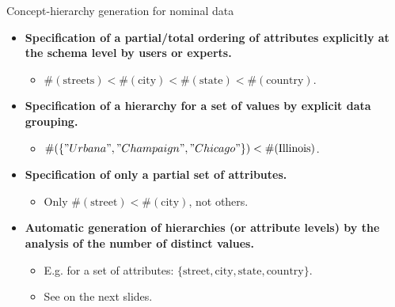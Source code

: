 \documentclass[aspectratio=169,t]{beamer}
\begin{document}
  { 
    \begin{frame}{Concept-hierarchy generation for nominal data}
        \begin{itemize}
            \item \textbf{Specification of a partial/total ordering of attributes explicitly at the schema level by users or experts.}
            \begin{itemize}
              \item $\#(\text{streets}) < \#(\text{city}) < \#(\text{state}) < \#(\text{country})$.
            \end{itemize}
            \item \textbf{Specification of a hierarchy for a set of values by explicit data grouping.}
            \begin{itemize}
              \item $\#(\{"Urbana", "Champaign", "Chicago"\}) < \#(\text{Illinois})$.
            \end{itemize}
            \item \textbf{Specification of only a partial set of attributes.}
            \begin{itemize}
              \item Only $\#(\text{street}) < \#(\text{city})$, not others.
            \end{itemize}
            \item \textbf{Automatic generation of hierarchies (or attribute levels) by the analysis of the number of distinct values.}
            \begin{itemize}
              \item E.g. for a set of attributes: $\{\text{street}, \text{city}, \text{state}, \text{country}\}$.
              \item See on the next slides.
            \end{itemize}
        \end{itemize}
    \end{frame}
  }
\end{document}
